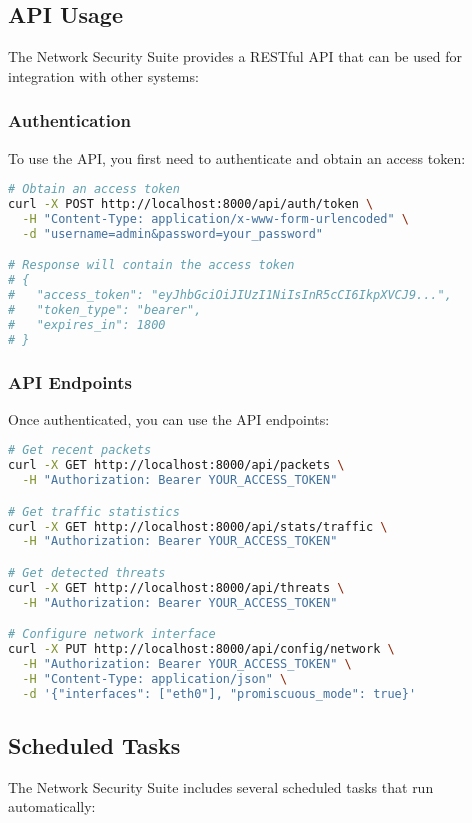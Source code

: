 \subsection{API Usage}
The Network Security Suite provides a RESTful API that can be used for integration with other systems:

\subsubsection{Authentication}
To use the API, you first need to authenticate and obtain an access token:

\begin{lstlisting}[language=bash, caption=API Authentication]
# Obtain an access token
curl -X POST http://localhost:8000/api/auth/token \
  -H "Content-Type: application/x-www-form-urlencoded" \
  -d "username=admin&password=your_password"

# Response will contain the access token
# {
#   "access_token": "eyJhbGciOiJIUzI1NiIsInR5cCI6IkpXVCJ9...",
#   "token_type": "bearer",
#   "expires_in": 1800
# }
\end{lstlisting}

\subsubsection{API Endpoints}
Once authenticated, you can use the API endpoints:

\begin{lstlisting}[language=bash, caption=API Endpoint Examples]
# Get recent packets
curl -X GET http://localhost:8000/api/packets \
  -H "Authorization: Bearer YOUR_ACCESS_TOKEN"

# Get traffic statistics
curl -X GET http://localhost:8000/api/stats/traffic \
  -H "Authorization: Bearer YOUR_ACCESS_TOKEN"

# Get detected threats
curl -X GET http://localhost:8000/api/threats \
  -H "Authorization: Bearer YOUR_ACCESS_TOKEN"

# Configure network interface
curl -X PUT http://localhost:8000/api/config/network \
  -H "Authorization: Bearer YOUR_ACCESS_TOKEN" \
  -H "Content-Type: application/json" \
  -d '{"interfaces": ["eth0"], "promiscuous_mode": true}'
\end{lstlisting}

\subsection{Scheduled Tasks}
The Network Security Suite includes several scheduled tasks that run automatically:

